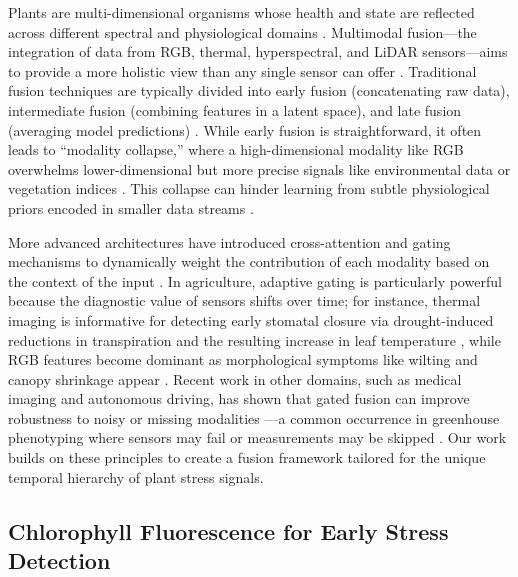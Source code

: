 \documentclass[a4paper,fleqn]{cas-dc}
\begin{document}
Plants are multi-dimensional organisms whose health and state are reflected across different spectral and physiological domains \citep{haqMultidimensionalOpticalRemote2025}. Multimodal fusion---the integration of data from RGB, thermal, hyperspectral, and LiDAR sensors---aims to provide a more holistic view than any single sensor can offer \citep{sankeyUAVLidarHyperspectral2017}. Traditional fusion techniques are typically divided into early fusion (concatenating raw data), intermediate fusion (combining features in a latent space), and late fusion (averaging model predictions) \citep{singhDeepLearningPlant2018}. While early fusion is straightforward, it often leads to ``modality collapse,'' where a high-dimensional modality like RGB overwhelms lower-dimensional but more precise signals like environmental data or vegetation indices \citep{huangModalityCompetitionWhat2022}. This collapse can hinder learning from subtle physiological priors encoded in smaller data streams \citep{mordacqADAPTMultimodalLearning2024}.

More advanced architectures have introduced cross-attention and gating mechanisms to dynamically weight the contribution of each modality based on the context of the input \citep{chengMultimodalCrossattentionNetwork2026}. In agriculture, adaptive gating is particularly powerful because the diagnostic value of sensors shifts over time; for instance, thermal imaging is informative for detecting early stomatal closure via drought-induced reductions in transpiration and the resulting increase in leaf temperature \citep{jeonMultimodalOpticalBiosensing2026}, while RGB features become dominant as morphological symptoms like wilting and canopy shrinkage appear \citep{wangRGBImagingbasedEvaluation2025}. Recent work in other domains, such as medical imaging and autonomous driving, has shown that gated fusion can improve robustness to noisy or missing modalities \citep{chenRobustMultimodalBrain2020, wangGMFDriveGatedMamba2025}---a common occurrence in greenhouse phenotyping where sensors may fail or measurements may be skipped \citep{moonAccurateImputationGreenhouse2021}. Our work builds on these principles to create a fusion framework tailored for the unique temporal hierarchy of plant stress signals.

\subsection{Chlorophyll Fluorescence for Early Stress Detection}\label{sec:related:fluorescence}
\end{document}
